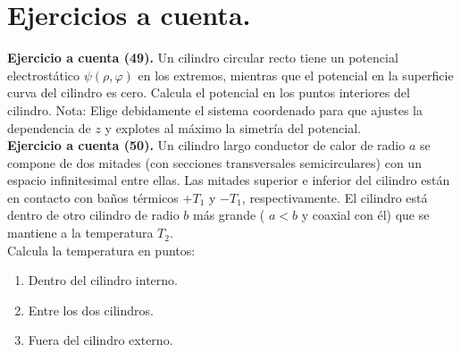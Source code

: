 \newpage

\section{Ejercicios a cuenta.}

\noindent
\textbf{Ejercicio a cuenta (49). } Un cilindro circular recto tiene un potencial electrostático $\psi (\rho, \varphi)$ en los extremos, mientras que el potencial en la superficie curva del cilindro es cero. Calcula el potencial en los puntos interiores del cilindro. Nota: Elige debidamente el sistema coordenado para que ajustes la dependencia de $z$ y explotes al máximo la simetría del potencial.
\\[0.5em]
\noindent
\textbf{Ejercicio a cuenta (50). } Un cilindro largo conductor de calor de radio $a$ se compone de dos mitades (con secciones transversales semicirculares) con un espacio infinitesimal entre ellas. Las mitades superior e inferior del cilindro están en contacto con baños térmicos $+T_{1}$ y $-T_{1}$, respectivamente. El cilindro está dentro de otro cilindro de radio $b$ más grande ( $a < b$ y coaxial con él) que se mantiene a la temperatura $T_{2}$. 
\\
\noindent
Calcula la temperatura en puntos:
\begin{enumerate}[label=\alph*)]
\item Dentro del cilindro interno.
\item Entre los dos cilindros.
\item Fuera del cilindro externo.
\end{enumerate}

